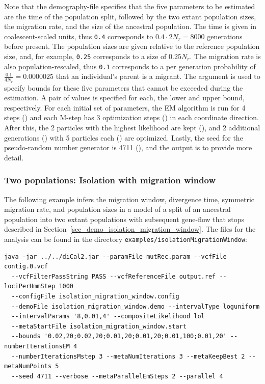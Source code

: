 \documentclass{article}
\numberwithin{equation}{section}
\begin{document}
Note that the demography-file specifies that the five parameters to be estimated are the time of the population split, followed by the two extant population sizes, the migration rate, and the size of the ancestral population. The time is given in coalescent-scaled units, thus \texttt{0.4} corresponds to $0.4 \cdot 2 N_r = 8000$ generations before present. The population sizes are given relative to the reference population size, and, for example, \texttt{0.25} corresponds to a size of $0.25 N_r$. The migration rate is also population-rescaled, thus \texttt{0.1} corresponds to a per generation probability of $\frac{0.1}{4 N_r} = 0.0000025$ that an individual's parent is a migrant. The argument  is used to specify bounds for these five parameters that cannot be exceeded during the estimation. A pair of values is specified for each, the lower and upper bound, respectively. For each initial set of parameters, the EM algorithm is run for 4 steps () and each M-step has 3 optimization steps () in each coordinate direction. After this, the 2 particles with the highest likelihood are kept (), and 2 additional generations () with 5 particles each () are optimized. Lastly, the seed for the pseudo-random number generator is 4711 (), and the output is  to provide more detail.

\subsubsection{Two populations: Isolation with migration window}

The following example infers the migration window, divergence time, symmetric migration rate, and population sizes in a model of a split of an ancestral population into two extant populations with subsequent gene-flow that stops described in Section~\ref{sec_demo_isolation_migration_window}. The files for the analysis can be found in the directory \texttt{examples/isolationMigrationWindow}:

\begin{verbatim}
java -jar ../../diCal2.jar --paramFile mutRec.param --vcfFile contig.0.vcf
  --vcfFilterPassString PASS --vcfReferenceFile output.ref --lociPerHmmStep 1000
  --configFile isolation_migration_window.config
  --demoFile isolation_migration_window.demo --intervalType loguniform
  --intervalParams '8,0.01,4' --compositeLikelihood lol
  --metaStartFile isolation_migration_window.start
  --bounds '0.02,20;0.02,20;0.01,20;0.01,20;0.01,100;0.01,20' --numberIterationsEM 4
  --numberIterationsMstep 3 --metaNumIterations 3 --metaKeepBest 2 --metaNumPoints 5
  --seed 4711 --verbose --metaParallelEmSteps 2 --parallel 4
\end{verbatim}
\end{document}
